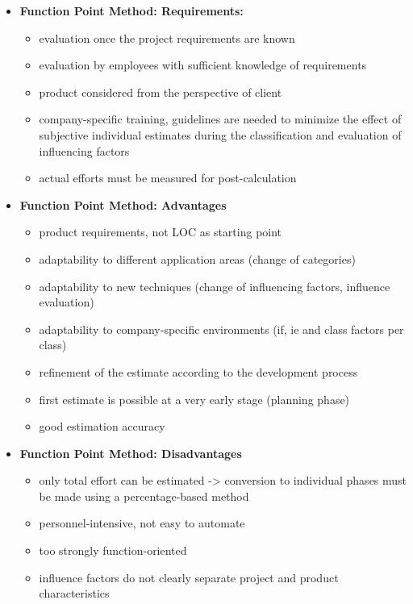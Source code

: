 \documentclass[ieeetran]{article}
\begin{document}
\begin{itemize}
\begin{enumerate}
\begin{itemize}
			\end{itemize}
	\end{enumerate}
\item \textbf{Function Point Method: Requirements:}
	\begin{itemize}
	  \item evaluation once the project requirements are known
	\item evaluation by employees with sufficient knowledge of requirements
\item product considered from the perspective of client
 \item company-specific training, guidelines are needed to minimize the effect of subjective individual estimates during the classification and evaluation of influencing factors
	 \item actual efforts must be measured for post-calculation
	\end{itemize}

\item \textbf{Function Point Method: Advantages}
	\begin{itemize}
	  \item product requirements, not LOC as starting point
	\item adaptability to different application areas (change of categories)
	\item adaptability to new techniques (change of influencing factors, influence evaluation)
		\item adaptability to company-specific environments (if, ie and class factors per class)
		\item refinement of the estimate according to the development process
		\item first estimate is possible at a very early stage (planning phase)
		\item good estimation accuracy
		\end{itemize}
\item \textbf{Function Point Method: Disadvantages}
	\begin{itemize}
	  \item only total effort can be estimated -> conversion to individual phases must be made using a percentage-based method
	\item personnel-intensive, not easy to automate
\item too strongly function-oriented
	\item influence factors do not clearly separate project and product characteristics
	\end{itemize}
\end{itemize}
\end{document}
